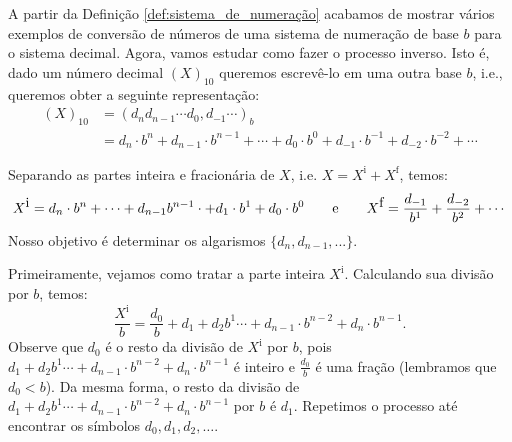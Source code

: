 \documentclass[main.tex]{subfiles}
\begin{document}
A partir da Definição \ref{def:sistema_de_numeração} acabamos de mostrar vários exemplos de conversão de números de uma sistema de numeração de base $b$ para o sistema decimal. Agora, vamos estudar como fazer o processo inverso. Isto é, dado um número decimal $(X)_{10}$ queremos escrevê-lo em uma outra base $b$, i.e., queremos obter a seguinte representação:
\begin{align*}
  (X)_{10} &= (d_nd_{n-1}\cdots d_0,d_{-1}\cdots)_{b} \\
  &= d_n\cdot b^{n}+d_{n-1}\cdot b^{n-1}+\cdots + d_0\cdot b^0+d_{-1}\cdot b^{-1}+d_{-2}\cdot b^{-2}+\cdots        
\end{align*}

Separando as partes inteira e fracionária de $X$, i.e. $X = X^{\mbox{i}} + X^{\mbox{f}}$, temos:
\begin{equation*}
X^{\mbox{i}} = d_n\cdot b^{n}+ \cdots+d_{n-1}b^{n-1} \cdot  +d_1\cdot b^1 +d_0\cdot b^0 \qquad \hbox{e}\qquad X^{\mbox{f}}
= \frac{d_{-1}}{b^1} + \frac{d_{-2}}{b^{2}} + \cdots  
\end{equation*}
Nosso objetivo é determinar os algarismos $\{d_n, d_{n-1}, ...\}$. 

Primeiramente, vejamos como tratar a parte inteira $X^{\mbox{i}}$. Calculando sua divisão por $b$, temos:
\begin{equation*}
\frac{X^{\mbox{i}}}{b}=   \frac{d_0}{b}+d_1+d_2 b^1\cdots+d_{n-1}\cdot b^{n-2} +d_n\cdot b^{n-1}.  
\end{equation*}
Observe que $d_0$ é o resto da divisão de $X^{\mbox{i}}$ por $b$, pois $d_1+d_2 b^1\cdots+d_{n-1}\cdot b^{n-2} +d_n\cdot b^{n-1}$ é inteiro e $\frac{d_0}{b}$ é uma fração (lembramos que $d_0<b$). Da mesma forma, o resto da divisão de $d_1+d_2 b^1\cdots+d_{n-1}\cdot b^{n-2} +d_n\cdot b^{n-1}$ por $b$ é $d_1$. Repetimos o processo até encontrar os símbolos $d_0, d_1, d_2, \ldots$.
\end{document}
